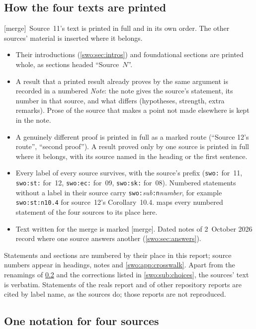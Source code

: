 \documentclass[11pt]{article}
\theoremstyle{definition}
\theoremstyle{remark}
\newcommand{\code}[1]{\texttt{\small #1}}
\newcommand{\merge}{\textsf{[merge]}}
\begin{document}
\subsection{How the four texts are printed}\label{swo:sub:printing}

\merge\ Source~11's text is printed in full and in its own order. The other
sources' material is inserted where it belongs.
\begin{itemize}
\item Their introductions (\cref{swo:sec:intros}) and foundational sections
are printed whole, as sections headed ``Source~$N$''.
\item A result that a printed result already proves by the same argument is
recorded in a numbered \emph{Note}: the note gives the source's statement,
its number in that source, and what differs (hypotheses, strength, extra
remarks). Prose of the source that makes a point not made elsewhere is kept
in the note.
\item A genuinely different proof is printed in full as a marked route
(``Source 12's route'', ``second proof''). A result proved only by one
source is printed in full where it belongs, with its source named in the
heading or the first sentence.
\item Every label of every source survives, with the source's prefix
(\code{swo:} for~11, \code{swo:st:} for~12, \code{swo:ec:} for~09,
\code{swo:sk:} for~08). Numbered statements without a label in their source
carry \code{swo:}\emph{sub}\code{:n}\emph{number}, for example
\code{swo:st:n10.4} for source~12's Corollary~10.4. 
maps every numbered statement of the four sources to its place here.
\item Text written for the merge is marked \merge. Dated notes of
2~October 2026 record where one source answers another
(\cref{swo:sec:answers}).
\end{itemize}
Statements and sections are numbered by their place in this report; source
numbers appear in headings, notes and \cref{swo:app:crosswalk}. Apart from
the renamings of \cref{swo:sec:notation} and the corrections listed in
\cref{swo:sub:choices}, the sources' text is verbatim. Statements of the
reals report and of other repository reports are cited by label name, as
the sources do; those reports are not reproduced.

\subsection{One notation for four sources}\label{swo:sec:notation}
\end{document}
